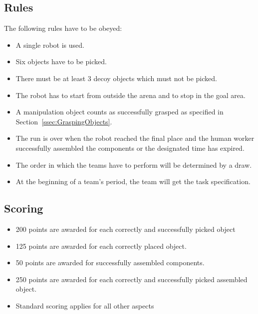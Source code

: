 \subsection{Rules}
The following rules have to be obeyed:

\begin{itemize}
	\item A single robot is used.
	\item Six objects have to be picked.
	\item There must be at least 3 decoy objects which must not be picked.
	\item The robot has to start from outside the arena and to stop in the goal area.
	\item A manipulation object counts as successfully grasped as specified in Section~\ref{ssec:GraspingObjects}.
	\item The run is over when the robot reached the final place and the human worker successfully assembled the components or the designated time has expired.
	\item The order in which the teams have to perform will be determined by a draw.
	\item At the beginning of a team's period, the team will get the task specification.
\end{itemize}

\subsection{Scoring}
\begin{itemize}
	\item 200 points are awarded for each correctly and successfully picked object
	\item 125 points are awarded for each correctly placed object.
	\item 50 points are awarded for successfully assembled components.
	\item 250 points are awarded for each correctly and successfully picked assembled object. 
	\item Standard scoring applies for all other aspects
\end{itemize}
